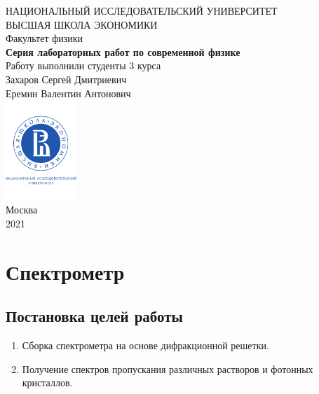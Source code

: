 \documentclass[a4paper, 12pt]{article}
\begin{document}
	\begin{titlepage}
		\begin{center}
			$$$$
			$$$$
			$$$$
			$$$$
			{\Large{НАЦИОНАЛЬНЫЙ ИССЛЕДОВАТЕЛЬСКИЙ УНИВЕРСИТЕТ}}\\
			\vspace{0.1cm}
			{\Large{ВЫСШАЯ ШКОЛА ЭКОНОМИКИ}}\\
			\vspace{0.25cm}
			{\large{Факультет физики}}\\
			\vspace{5.5cm}
			{\Huge\textbf{{Серия лабораторных работ по современной физике}}}\\%
			\vspace{1cm}
			{Работу выполнили студенты 3 курса}\\
			{Захаров Сергей Дмитриевич}\\
			{Еремин Валентин Антонович}\\
			\vfill
			\includegraphics[width = 0.2\textwidth]{HSElogo}\\
			\vfill
			Москва\\
			2021
		\end{center}
	\end{titlepage}
	
\tableofcontents

\newpage

\section{Спектрометр}

\subsection{Постановка целей работы}

\begin{enumerate}
	\item Сборка спектрометра на основе дифракционной решетки.
	
	\item Получение спектров пропускания различных растворов и фотонных кристаллов.
	
\end{enumerate}
\end{document}
